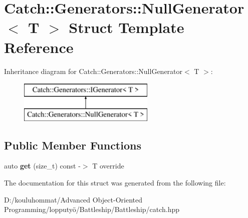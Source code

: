 \hypertarget{struct_catch_1_1_generators_1_1_null_generator}{}\section{Catch\+:\+:Generators\+:\+:Null\+Generator$<$ T $>$ Struct Template Reference}
\label{struct_catch_1_1_generators_1_1_null_generator}
Inheritance diagram for Catch\+:\+:Generators\+:\+:Null\+Generator$<$ T $>$\+:\begin{figure}[H]
\begin{center}
\leavevmode
\includegraphics[height=2.000000cm]{struct_catch_1_1_generators_1_1_null_generator}
\end{center}
\end{figure}
\subsection*{Public Member Functions}
\begin{DoxyCompactItemize}
\item 
\mbox{\label{struct_catch_1_1_generators_1_1_null_generator_a17a2cc82d644e97afded4017c7a062ef}} 
auto {\bfseries get} (size\+\_\+t) const -\/$>$ T override
\end{DoxyCompactItemize}


The documentation for this struct was generated from the following file\+:\begin{DoxyCompactItemize}
\item 
D\+:/kouluhommat/\+Advanced Object-\/\+Oriented Programming/lopputyö/\+Battleship/\+Battleship/catch.\+hpp\end{DoxyCompactItemize}
